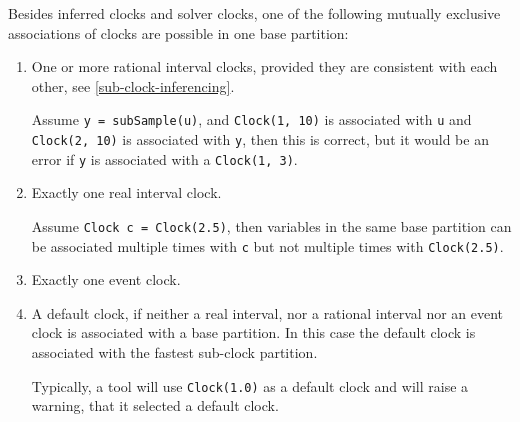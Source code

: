 Besides inferred clocks and solver clocks, one of the following mutually
exclusive associations of clocks are possible in one base partition:
\begin{enumerate}
\item
  One or more rational interval clocks, provided they are consistent with each other, see \cref{sub-clock-inferencing}.
  \begin{example}
  Assume \lstinline!y = subSample(u)!, and \lstinline!Clock(1, 10)! is associated with \lstinline!u! and \lstinline!Clock(2, 10)! is associated with \lstinline!y!, then this is correct, but it would be an error if \lstinline!y! is associated with a \lstinline!Clock(1, 3)!.
  \end{example}
\item
  Exactly one real interval clock.
  \begin{example}
  Assume \lstinline!Clock c = Clock(2.5)!, then variables in the same base partition can be associated multiple times with \lstinline!c! but not multiple times with \lstinline!Clock(2.5)!.
  \end{example}
\item
  Exactly one event clock.
\item
  A default clock, if neither a real interval, nor a rational interval nor an event clock is associated with a base partition.  In this case the default clock is associated with the fastest sub-clock partition.
  \begin{nonnormative}
  Typically, a tool will use \lstinline!Clock(1.0)! as a default clock and will raise a warning, that it selected a default clock.
  \end{nonnormative}
\end{enumerate}


